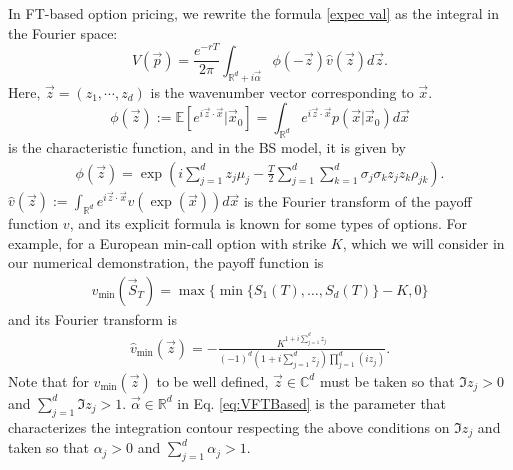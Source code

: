 In FT-based option pricing, we rewrite the formula \eqref{expec val} as the integral in the Fourier space:
\begin{equation}
V(\vec{p}) = \frac{e^{-rT}}{2\pi} \int_{\mathbb{R}^d+i\vec{\alpha}}\phi(-\vec{z})\hat{v}(\vec{z})d\vec{z}. 
\label{eq:VFTBased}
\end{equation}
Here, $\vec{z}=(z_1,\cdots,z_d)$ is the wavenumber vector corresponding to $\vec{x}$.
\begin{equation}
\phi(\vec{z}):=\mathbb{E}[e^{i\vec{z}\cdot\vec{x}}|\vec{x}_0]=\int_{\mathbb{R}^d} e^{i\vec{z}\cdot\vec{x}}p(\vec{x}|\vec{x}_0)d\vec{x}    
\end{equation}
is the characteristic function, and in the BS model, it is given by
\begin{align}
    \phi(\vec{z}) = \exp \left(i \sum_{j=1}^d z_j \mu_j-
    \frac{T}{2} \sum_{j=1}^d \sum_{k=1}^d \sigma_j \sigma_k z_j z_k \rho_{j k}\right). 
\label{eq:phi_tt}
\end{align}
$\hat{v}(\vec{z}):=\int_{\mathbb{R}^d} e^{i\vec{z}\cdot\vec{x}}v(\exp(\vec{x}))d\vec{x}$ is the Fourier transform of the payoff function $v$, and its explicit formula is known for some types of options.
For example, for a European min-call option with strike $K$, which we will consider in our numerical demonstration, the payoff function is
\begin{align}
    v_{\text{min}}(\vec{S}_T) = \max\{\min\{S_{1}(T), \ldots, S_{d}(T)\} - K, 0\}
\label{min option}
\end{align}
and its Fourier transform is \cite{Eberlein2010}
\begin{align}
    \hat{v}_{\min }(\vec{z})=-\frac{K^{1+i \sum_{j=1}^d z_j}}{(-1)^d\left(1+i \sum_{j=1}^d z_j\right) \prod_{j=1}^d (i z_j)}.
\label{eq:vmin_tt}
\end{align}
Note that for $\hat{v}_{\min }(\vec{z})$ to be well defined, $\vec{z}\in\mathbb{C}^d$ must be taken so that $\Im z_j>0$ and $\sum_{j=1}^d \Im z_j > 1$.
$\vec{\alpha}\in\mathbb{R}^d$ in Eq. \eqref{eq:VFTBased} is the parameter that characterizes the integration contour respecting the above conditions on $\Im z_j$ and taken so that $\alpha_j>0$ and $\sum_{j=1}^d \alpha_j > 1$.

